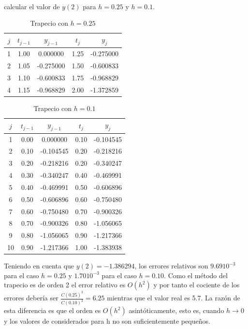 \documentclass{article}
\theoremstyle{theorem-style}  %
\theoremstyle{definition-style}
\theoremstyle{example-style}
\begin{document}
calcular el valor de $y(2)$ para $h=0.25$ y $h=0.1$.

	\begin{table}[H]
		\centering
		\begin{tabular}{|| c | c | c | c | c ||}
			\hline
			\hline $j$ &  $t_{j-1}$ & $y_{j-1}$ & $t_j$ & $y_j$ \\
			\hline 1 & 1.00 & 0.000000 & 1.25 & -0.275000 \\
			\hline 2 & 1.05 & -0.275000 & 1.50 & -0.600833 \\
			\hline 3 & 1.10 & -0.600833 & 1.75 & -0.968829 \\
			\hline 4 & 1.15 & -0.968829 & 2.00 & -1.372859 \\
			\hline
			\hline
		\end{tabular}
		\caption{Trapecio con $h=0.25$}
		\label{table:trapecio-ejemplo2.1}
	\end{table}

	\begin{table}[H]
		\centering
		\begin{tabular}{|| c | c | c | c | c ||}
			\hline
			\hline $j$ &  $t_{j-1}$ & $y_{j-1}$ & $t_j$ & $y_j$ \\
			\hline 1 & 0.00 & 0.000000 & 0.10 & -0.104545 \\
			\hline 2 & 0.10 & -0.104545 & 0.20 & -0.218216 \\
			\hline 3 & 0.20 & -0.218216 & 0.20 & -0.340247 \\
			\hline 4 & 0.30 & -0.340247 & 0.40 & -0.469991 \\
			\hline 5 & 0.40 & -0.469991 & 0.50 & -0.606896 \\
			\hline 6 & 0.50 & -0.606896 & 0.60 & -0.750480 \\
			\hline 7 & 0.60 & -0.750480 & 0.70 & -0.900326 \\
			\hline 8 & 0.70 & -0.900326 & 0.80 & -1.056065 \\
			\hline 9 & 0.80 & -1.056065 & 0.90 & -1.217366 \\
			\hline 10 & 0.90 & -1.217366 & 1.00 & -1.383938 \\
			\hline
			\hline
		\end{tabular}
		\caption{Trapecio con $h=0.1$}
		\label{table:trapecio-ejemplo2.2}
	\end{table}

	Teniendo en cuenta que $y(2)=-1.386294$, los errores relativos son $9.69 10^{-3}$ para el caso $h=0.25$ y $1.70 10^{-3}$ para el caso $h=0.10$. Como el método del trapecio es de orden 2 el error relativo es $O(h^2)$ y por tanto el cociente de los errores debería ser $\frac{C(0.25)^2}{C(0.10)^2}=6.25$ mientras que el valor real es 5.7. La razón de esta diferencia es que el orden es $O(h^2)$ asintóticamente, esto es, cuando $h \to 0$ y los valores de considerados para h no son suficientemente pequeños.
\end{document}
